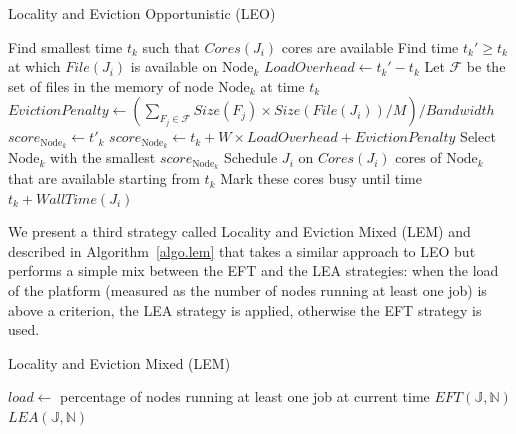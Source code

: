 \documentclass[conference,10pt]{IEEEtran}
\newcommand{\Node}[1]{\ensuremath{\mathrm{Node}_{#1}}\xspace}
\newcommand{\file}{\ensuremath{\mathit{File}}\xspace}
\newcommand{\size}{\ensuremath{\mathit{Size}}\xspace}
\newcommand{\memory}{\ensuremath{\mathit{M}}\xspace}
\newcommand{\bandwidth}{\mathit{Bandwidth}\xspace}
\newcommand{\core}{\mathit{Cores}\xspace}
\newcommand{\walltime}{\mathit{WallTime}\xspace}
\newcommand{\jobset}{\ensuremath{\mathbb{J}}\xspace}
\newcommand{\nodeset}{\ensuremath{\mathbb{N}}\xspace}
\begin{document}
\begin{algorithm}[htb]%
\caption{Locality and Eviction Opportunistic (LEO)}\label{algo.leo}
\begin{algorithmic}[1]
		\ForEach{$\Node{k} \in \nodeset$}
			\State Find smallest time $t_k$ such that $\core(J_i)$ cores are available
			\State Find time $t_k'\geq t_k$ at which $\file(J_i)$ is available on $\Node{k}$
			\State $\mathit{LoadOverhead} \gets t_k' - t_k$ %
                        \State Let $\mathcal{F}$ be the set of files in the memory of node \Node{k} at time $t_k$
			\State $\mathit{EvictionPenalty} \gets (\sum_{F_j\in\mathcal{F}}\size(F_j) \times \size(\file(J_i))/\memory)/\bandwidth$
				\State $score_{\Node{k}} \gets t'_k$
			\Else
			         \State $score_{\Node{k}} \gets t_k + W \times \mathit{LoadOverhead} + \mathit{EvictionPenalty}$
			\EndIf
		\EndFor
                \State Select \Node{k} with the smallest $score_{\Node{k}}$
                \State Schedule $J_i$ on $\core(J_i)$ cores of \Node{k} that are available starting from $t_k$
                \State Mark these cores busy until time $t_k +\walltime(J_i)$
	\EndFor
\end{algorithmic}
\end{algorithm}

We present a third strategy called Locality and Eviction Mixed (LEM)
and described in Algorithm~\ref{algo.lem} that takes a similar approach to
LEO but performs a simple mix between the EFT and the LEA strategies:
when the load of the platform (measured as the number of nodes running
at least one job) is above a criterion, the LEA strategy is applied,
otherwise the EFT strategy is used.
 

\begin{algorithm}[htb]%
\caption{Locality and Eviction Mixed (LEM)}\label{algo.lem}
\begin{algorithmic}[1]
		\State $\mathit{load} \gets$  percentage of nodes running at least one job at current time
			\State $EFT(\jobset,\nodeset)$
		\Else
			\State $LEA(\jobset,\nodeset)$
		\EndIf
	\EndFor
\end{algorithmic}
\end{algorithm}
\end{document}
